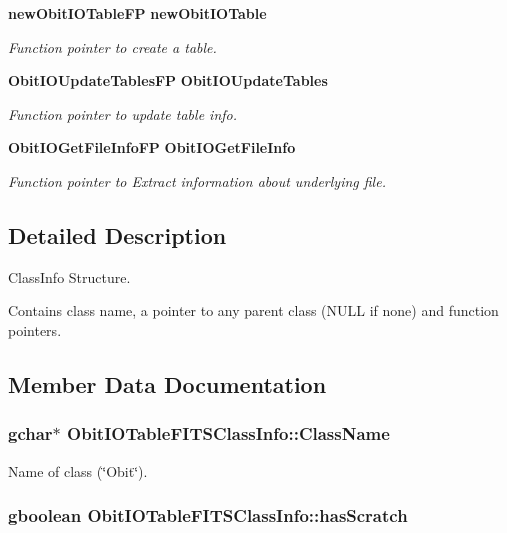 \begin{CompactItemize}
{\bf new\-Obit\-IOTable\-FP} {\bf new\-Obit\-IOTable}
\begin{CompactList}\small\item\em Function pointer to create a table. \item\end{CompactList}\item 
{\bf Obit\-IOUpdate\-Tables\-FP} {\bf Obit\-IOUpdate\-Tables}
\begin{CompactList}\small\item\em Function pointer to update table info. \item\end{CompactList}\item 
{\bf Obit\-IOGet\-File\-Info\-FP} {\bf Obit\-IOGet\-File\-Info}
\begin{CompactList}\small\item\em Function pointer to Extract information about underlying file. \item\end{CompactList}\end{CompactItemize}


\subsection{Detailed Description}
Class\-Info Structure. 

Contains class name, a pointer to any parent class (NULL if none) and function pointers. 



\subsection{Member Data Documentation}
\subsubsection{\setlength{\rightskip}{0pt plus 5cm}gchar$\ast$ {\bf Obit\-IOTable\-FITSClass\-Info::Class\-Name}}\label{structObitIOTableFITSClassInfo_o2}


Name of class (\char`\"{}Obit\char`\"{}). 

\subsubsection{\setlength{\rightskip}{0pt plus 5cm}gboolean {\bf Obit\-IOTable\-FITSClass\-Info::has\-Scratch}}\label{structObitIOTableFITSClassInfo_o1}


